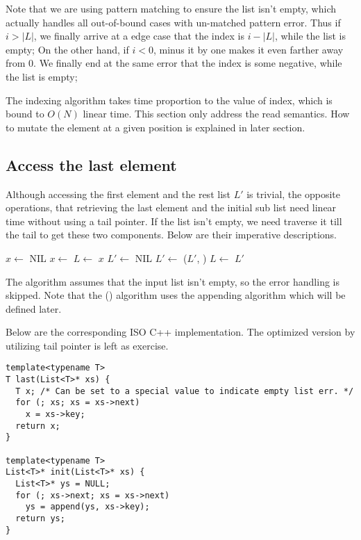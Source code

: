 \documentclass{article}
\begin{document}
Note that we are using pattern matching to ensure the list isn't empty, which actually handles
all out-of-bound cases with un-matched pattern error. Thus if $i > |L|$, we finally arrive at
a edge case that the index is $i-|L|$, while the list is empty; On the other hand, if $i < 0$,
minus it by one makes it even farther away from 0. We finally end at the same error that the index 
is some negative, while the list is empty;

The indexing algorithm takes time proportion to the value of index, which is bound to $O(N)$
linear time. 
This section only address the read semantics. How to mutate the element at a given position is
explained in later section.

\subsection{Access the last element}
Although accessing the first element and the rest list $L'$ is trivial, the opposite operations, that
retrieving the last element and the initial sub list need linear time without using a tail pointer. 
If the list isn't empty, we need traverse it till the tail to get these two components. Below are 
their imperative descriptions.

\begin{algorithmic}
  \State $x \gets $ NIL
    \State $x \gets $ 
    \State $L \gets $ 
  \EndWhile
  \State \Return $x$
\EndFunction
\Statex
{}
  \State $L' \gets $ NIL
    \State $L' \gets$ ($L'$, )
    \State $L \gets $ 
  \EndWhile
  \State \Return $L'$
\EndFunction
\end{algorithmic}

The algorithm assumes that the input list isn't empty, so the error handling is skipped. Note that
the () algorithm uses the appending algorithm which will be defined later.

Below are the corresponding ISO C++ implementation. The optimized version by utilizing tail pointer
is left as exercise.

\lstset{language=C++}
\begin{lstlisting}
template<typename T>
T last(List<T>* xs) {
  T x; /* Can be set to a special value to indicate empty list err. */
  for (; xs; xs = xs->next)
    x = xs->key;
  return x;
}

template<typename T>
List<T>* init(List<T>* xs) {
  List<T>* ys = NULL;
  for (; xs->next; xs = xs->next)
    ys = append(ys, xs->key);
  return ys;
}
\end{lstlisting}
\end{document}

